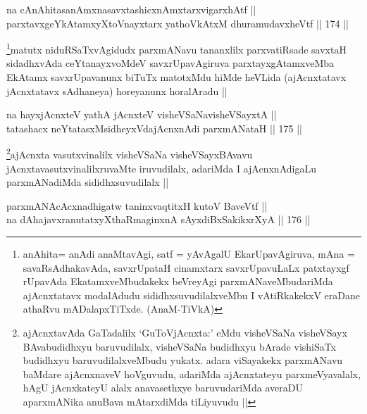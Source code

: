 
\begin{shl}
na cAnAhitasanAmxnasavxtashicxnAmxtarxvigarxhAtf ||  \\
parxtavxgeYkAtamxyXtoV\s nayxtarx yathoVkAtxM dhuramudavxheVtf ||  174 ||  
\end{shl}

\begin{artha}
\footnote{anAhita= anAdi anaMtavAgi, satf = yAvAgalU EkarUpavAgiruva, mAna = savaRsAdhakavAda, savxrUpataH cinamxtarx savxrUpavuLaLx patxtayxgf rUpavAda EkatamxveMbudakekx beVreyAgi parxmANaveMbudariMda ajAcnxtatavx modalAdudu sididhxsuvudilalxveMbu I vAtiRkakekxV eraDane athaRvu mADalapxTiTxde. (AnaM-TiVkA)}matutx niduRSaTxvAgidudx parxmANavu tananxlilx parxvatiRsade savxtaH sidadhxvAda ceYtanayxvoMdeV savxrUpavAgiruva parxtayxgAtamxveMba EkAtamx savxrUpavanunx biTuTx matotxMdu hiMde heVLida (ajAcnxtatavx jAcnxtatavx sAdhaneya) horeyanunx horalAradu ||
\end{artha}

\begin{shl}
na hayxjAcnxteV yathA jAcnxteV visheVSaNavisheVSayxtA || \\
tatashacx neYtatasxMsidheyxVdajAcnxnAdi parxmANataH ||  175 ||  
\end{shl}

\begin{artha}
\footnote{ajAcnxtavAda GaTadalilx `GuToVjAcnxta:' eMdu visheVSaNa visheVSayx BAvabudidhxyu baruvudilalx, visheVSaNa budidhxyu bArade vishiSaTx budidhxyu baruvudilalxveMbudu yukatx. adara viSayakekx parxmANavu baMdare ajAcnxnaveV hoVguvudu, adariMda ajAcnxtateyu parxmeVyavalalx, hAgU jAcnxkateyU alalx anavasethxye baruvudariMda averaDU aparxmANika anuBava mAtarxdiMda tiLiyuvudu ||}ajAcnxta vasutxvinalilx visheVSaNa visheVSayxBAvavu jAcnxtavasutxvinalilxruvaMte iruvudilalx, adariMda I ajAcnxnAdigaLu parxmANadiMda sididhxsuvudilalx ||
\end{artha}


\begin{shl}
parxmANAcAcxnadhigatw taninxvaqtitxH kutoV BaveVtf ||  \\
na dAhajavxranutatxyXthaRmaginxnA sAyxdiBxSakikxrXyA ||  176 ||  
\end{shl}

